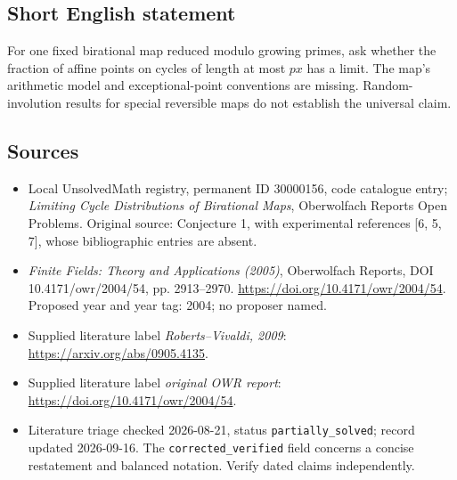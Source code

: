 \documentclass[11pt]{article}
\begin{document}
\subsection{Short English statement}
For one fixed birational map reduced modulo growing primes, ask whether the fraction of affine points on cycles of length at most \(px\) has a limit. The map's arithmetic model and exceptional-point conventions are missing. Random-involution results for special reversible maps do not establish the universal claim.
\subsection{Sources}
\begin{itemize}\item Local UnsolvedMath registry, permanent ID 30000156, code catalogue entry; \emph{Limiting Cycle Distributions of Birational Maps}, Oberwolfach Reports Open Problems. Original source: Conjecture 1, with experimental references [6, 5, 7], whose bibliographic entries are absent.\item \emph{Finite Fields: Theory and Applications (2005)}, Oberwolfach Reports, DOI 10.4171/owr/2004/54, pp. 2913--2970. \url{https://doi.org/10.4171/owr/2004/54}. Proposed year and year tag: 2004; no proposer named.\item Supplied literature label \emph{Roberts--Vivaldi, 2009}: \url{https://arxiv.org/abs/0905.4135}.\item Supplied literature label \emph{original OWR report}: \url{https://doi.org/10.4171/owr/2004/54}.\item Literature triage checked 2026-08-21, status \texttt{partially\_solved}; record updated 2026-09-16. The \texttt{corrected\_verified} field concerns a concise restatement and balanced notation. Verify dated claims independently.\end{itemize}
\end{document}
